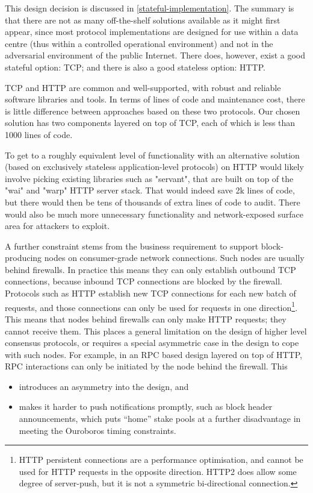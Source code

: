 \documentclass[11pt,a4paper]{article}
\begin{document}
This design decision is discussed in
\cref{stateful-implementation}. The summary
is that there are not as many off-the-shelf solutions available as it
might first appear, since most protocol implementations are designed for
use within a data centre (thus within a controlled operational
environment) and not in the adversarial environment of the public
Internet. There does, however, exist a good stateful option: TCP; and
there is also a good stateless option: HTTP.

TCP and HTTP are common and well-supported, with robust and reliable
software libraries and tools. In terms of lines of code and maintenance
cost, there is little difference between approaches based on these two
protocols. Our chosen solution has two components layered on top of TCP,
each of which is less than 1000 lines of code.

To get to a roughly equivalent level of functionality with an
alternative solution (based on exclusively stateless application-level
protocols) on HTTP would likely involve picking existing libraries such
as "servant", that are built on top of the "wai" and "warp" HTTP server
stack. That would indeed save 2k lines of code, but there would then be
tens of thousands of extra lines of code to audit. There would also be
much more unnecessary functionality and network-exposed surface area for
attackers to exploit.

A further constraint stems from the business requirement to support
block-producing nodes on consumer-grade network connections. Such nodes
are usually behind firewalls. In practice this means they can only
establish outbound TCP connections, because inbound TCP connections are
blocked by the firewall. Protocols such as HTTP establish new TCP
connections for each new batch of requests, and those connections can
only be used for requests in one direction\footnote{HTTP persistent
  connections are a performance optimisation, and cannot be used for
  HTTP requests in the opposite direction. HTTP2 does allow some degree
  of server-push, but it is not a symmetric bi-directional connection.}.
This means that nodes behind firewalls can only make HTTP requests; they
cannot receive them. This places a general limitation on the design of
higher level consensus protocols, or requires a special asymmetric case
in the design to cope with such nodes. For example, in an RPC based
design layered on top of HTTP, RPC interactions can only be initiated by
the node behind the firewall. This

\begin{itemize}
\item
  introduces an asymmetry into the design, and
\item
  makes it harder to push notifications promptly, such as block header
  announcements, which puts ``home'' stake pools at a further
  disadvantage in meeting the Ouroboros timing constraints.
\end{itemize}
\end{document}
